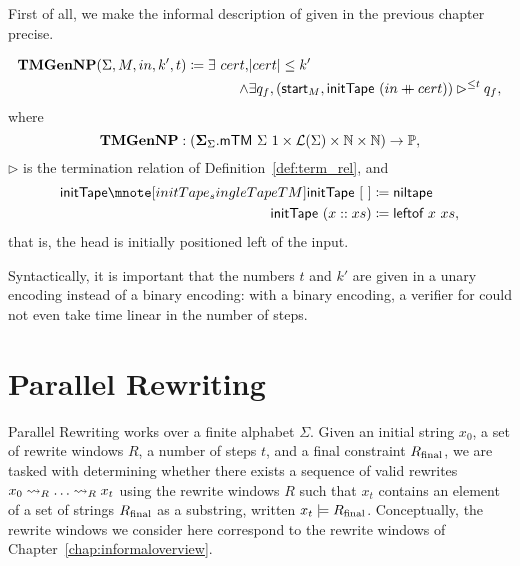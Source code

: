 First of all, we make the informal description of \gennp{} given in the previous chapter precise.
\begin{definition}[TMGenNP][SingleTMGenNP]\label{def:tmgennp}
  \begin{align*}
    \normalfont\textbf{TMGenNP}{} (\Sigma, M,  in, k', t) \coloneqq \exists~cert, &|cert| \le k' \\
    \land &\exists q_f, ({\textsf{start}}_M, \textsf{initTape}~(in \mathbin{+\mkern-10mu+} cert)) \rhd^{\le t} q_f, 
  \end{align*}
  where 
  \[\normalfont\textbf{TMGenNP}{} : (\bm{\Sigma}_{{\Sigma}}. \textsf{mTM}~\Sigma~1 \times \mathcal{L} (\Sigma) \times \mathbb{N} \times \mathbb{N}) \rightarrow \mathbb{P}, \]
  $\rhd$ is the termination relation of Definition~\ref{def:term_rel}, 
  and 
  \begin{align*}
    \mnotec[initTape_singleTapeTM]{\textsf{initTape}}~\nil &\defeq \textsf{niltape} \\
    \textsf{initTape}~(x::xs) &\defeq \textsf{leftof}~x~xs,
  \end{align*}
  that is, the head is initially positioned left of the input.
\end{definition}

Syntactically, it is important that the numbers $t$ and $k'$ are given in a unary encoding instead of a binary encoding: with a binary encoding, a verifier for \gennp{} could not even take time linear in the number of steps. 

\section{Parallel Rewriting}\label{sec:pr}
Parallel Rewriting works over a finite alphabet $\Sigma$. Given an initial string $x_0$, a set of rewrite windows $R$, a number of steps $t$, and a final constraint $R_{\text{final}}$, we are tasked with determining whether there exists a sequence of valid rewrites $x_0 \rightsquigarrow_{R} \ldots \rightsquigarrow_{R} x_t$ using the rewrite windows $R$ such that $x_t$ contains an element of a set of strings $R_{\text{final}}$ as a substring, written $x_t \models R_{\text{final}}$. Conceptually, the rewrite windows we consider here correspond to the rewrite windows of Chapter~\ref{chap:informaloverview}.

